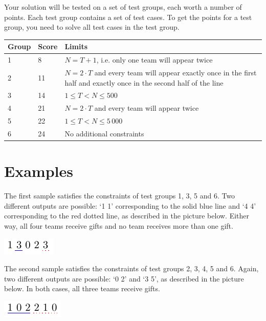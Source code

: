 Your solution will be tested on a set of test groups, each worth a number of points.
Each test group contains a set of test cases.
To get the points for a test group, you need to solve all test cases in the test group.


\begin{tabular}{|l|l|l|}
\hline
Group  &  Score  &  Limits \\
\hline
  1 & 8 & $N = T + 1$, i.e. only one team will appear twice   \\
\hline
  2 & 11 & $N = 2 \cdot T$ and every team will appear exactly once in the first half and exactly once in the second half of the line   \\
\hline
  3 & 14 & $1 \leq T < N \leq 500$   \\
\hline
  4 & 21 & $N = 2 \cdot T$ and every team will appear twice   \\
\hline
  5 & 22 & $1 \leq T < N \leq 5\,000$   \\
\hline
  6 & 24 & No additional constraints   \\
\hline
\end{tabular}
\section*{Examples}
The first sample satisfies the constraints of test groups 1, 3, 5 and 6. Two different outputs are possible: `1 1' corresponding to the solid blue line and `4 4' corresponding to the red dotted line, as described in the picture below. Either way, all four teams receive gifts and no team receives more than one gift.



\begin{center}
\includegraphics[width=0.8\linewidth]{sample1.pdf}
\end{center}


The second sample satisfies the constraints of test groups 2, 3, 4, 5 and 6. Again, two different outputs are possible: `0 2' and `3 5', as described in the picture below. In both cases, all three teams receive gifts.


\begin{center}
\includegraphics[width=0.8\linewidth]{sample2.pdf}
\end{center}


